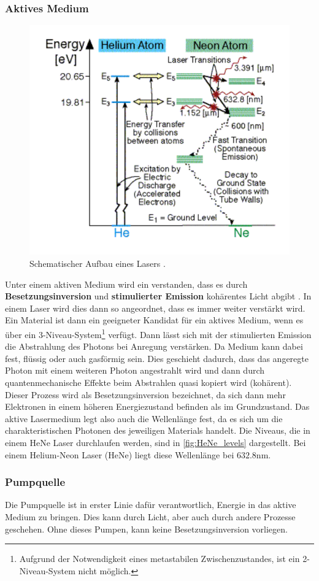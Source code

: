 \subsubsection*{Aktives Medium}
\begin{figure}
    \includegraphics{pictures/HeNe_levels.pdf}
    \caption{Schematischer Aufbau eines Lasers \cite{HeNe_levels}.}
    \label{fig:HeNe_levels}
\end{figure}
Unter einem aktiven Medium wird ein verstanden, dass es durch \textbf{Besetzungsinversion} und \textbf{stimulierter Emission} kohärentes Licht abgibt \cite{demtroeder_laser}.
In einem Laser wird dies dann so angeordnet, dass es immer weiter verstärkt wird.
Ein Material ist dann ein geeigneter Kandidat für ein aktives Medium, wenn es über ein 3-Niveau-System\footnote{Aufgrund der Notwendigkeit eines metastabilen Zwischenzustandes, ist ein 2-Niveau-System nicht möglich.} verfügt.
Dann lässt sich mit der stimulierten Emission die Abstrahlung des Photons bei Anregung verstärken.
Da Medium kann dabei fest, flüssig oder auch gasförmig sein.
Dies geschieht dadurch, dass das angeregte Photon mit einem weiteren Photon angestrahlt wird und dann durch quantenmechanische Effekte beim Abstrahlen quasi kopiert wird (kohärent).
Dieser Prozess wird als Besetzungsinversion bezeichnet, da sich dann mehr Elektronen in einem höheren Energiezustand befinden als im Grundzustand.
Das aktive Lasermedium legt also auch die Wellenlänge fest, da es sich um die charakteristischen Photonen des jeweiligen Materials handelt.
Die Niveaus, die in einem HeNe Laser durchlaufen werden, sind in \autoref{fig:HeNe_levels} dargestellt.
Bei einem Helium-Neon Laser (HeNe) liegt diese Wellenlänge bei $632.8 \unit{\nano\meter}$.
\subsubsection*{Pumpquelle}
Die Pumpquelle ist in erster Linie dafür verantwortlich, Energie in das aktive Medium zu bringen.
Dies kann durch Licht, aber auch durch andere Prozesse geschehen.
Ohne dieses Pumpen, kann keine Besetzungsinversion vorliegen.